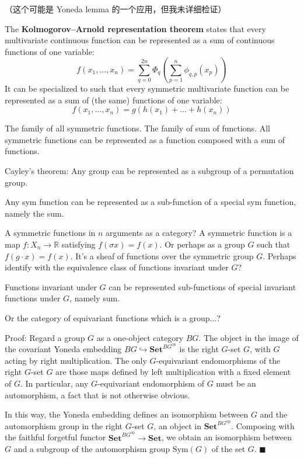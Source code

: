 （这个可能是 Yoneda lemma 的一个应用，但我未详细检证）

The \textbf{Kolmogorov–Arnold representation theorem} states that every multivariate continuous function can be represented as a sum of continuous functions of one variable:
\begin{equation}
f(x_1,... ,x_n) = \sum_{q=0}^{2n}\Phi_{q} \left(\sum_{p=1}^n \phi_{q,p}(x_p) \right)
\end{equation}
It can be specialized to such that every symmetric multivariate function can be represented as a sum of (the same) functions of one variable:
\begin{equation}
\label{symmetric-functions}
f(x_1, ..., x_n) = g(h(x_1) + ... + h(x_n))
\end{equation}

The family of all symmetric functions.  The family of sum of functions.  All symmetric functions can be represented as a function composed with a sum of functions.

Cayley's theorem:  Any group can be represented as a subgroup of a permutation group.

Any sym function can be represented as a sub-function of a special sym function, namely the sum.

A symmetric functions in $n$ arguments as a category?  A symmetric function is a map $f: X_n \rightarrow \mathbb{R}$ satisfying $f (\sigma x) = f(x)$.  Or perhaps as a group $G$ such that $f(g \cdot x) = f(x)$.  It's a sheaf of functions over the symmetric group $G$.  Perhaps identify with the equivalence class of functions invariant under $G$?

Functions invariant under $G$ can be represented sub-functions of special invariant functions under $G$, namely sum.

Or the category of equivariant functions which is a group...?



Proof:  Regard a group $G$ as a one-object category $BG$.  The object in the image of the covariant Yoneda embedding $BG \hookrightarrow \mathbf{Set}^{BG^{\mathrm{op}}}$ is the right $G$-set $G$, with $G$ acting by right multiplication.   The only $G$-equivariant endomorphisms of the right $G$-set $G$ are those maps defined by left multiplication with a fixed element of $G$.  In particular, any $G$-equivariant endomorphism of $G$ must be an automorphism, a fact that is not otherwise obvious.

In this way, the Yoneda embedding defines an isomorphism between $G$ and the automorphism group in the right $G$-set $G$, an object in $\mathbf{Set}^{BG^{\mathrm{op}}}$.  Composing with the faithful forgetful functor $\mathbf{Set}^{BG^{\mathrm{op}}} \rightarrow \mathbf{Set}$, we obtain an isomorphism between $G$ and a subgroup of the automorphism group $\mathrm{Sym}(G)$ of the set $G$.  $\blacksquare$

